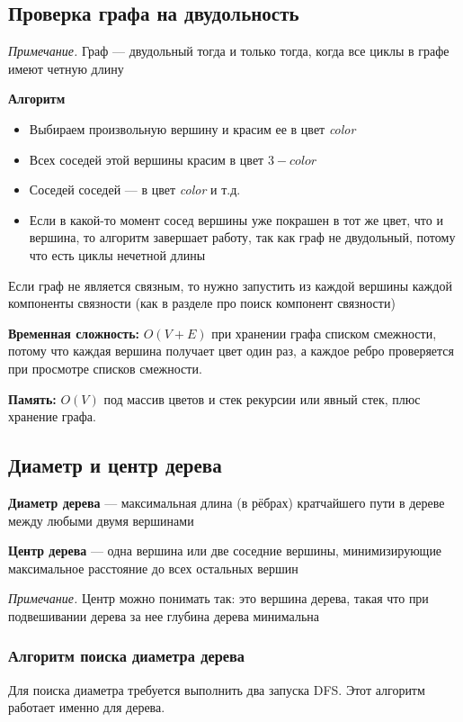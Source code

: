 \documentclass[a4paper]{article}
\begin{document}
\subsection{Проверка графа на двудольность}
\textit{Примечание.} Граф — двудольный тогда и только тогда, когда все циклы в графе имеют четную длину

\textbf{Алгоритм}

\begin{itemize}
    \item Выбираем произвольную вершину и красим ее в цвет \textit{color}
    \item Всех соседей этой вершины красим в цвет $3-color$
    \item Соседей соседей — в цвет \textit{color} и т.д.
    \item Если в какой-то момент сосед вершины уже покрашен в тот же цвет, что и вершина, то алгоритм завершает работу, так как граф не двудольный, потому что есть циклы нечетной длины
\end{itemize}

Если граф не является связным, то нужно запустить \dfs из каждой вершины каждой компоненты связности (как в разделе про поиск компонент связности)

\textbf{Временная сложность:} $O(V+E)$ при хранении графа списком смежности, потому что каждая вершина получает цвет один раз, а каждое ребро проверяется при просмотре списков смежности.

\textbf{Память:} $O(V)$ под массив цветов и стек рекурсии или явный стек, плюс хранение графа.


\subsection{Диаметр и центр дерева}
\textbf{Диаметр дерева} — максимальная длина (в рёбрах) кратчайшего пути в дереве между любыми двумя вершинами

\textbf{Центр дерева} — одна вершина или две соседние вершины, минимизирующие максимальное расстояние до всех остальных вершин

\textit{Примечание.} Центр можно понимать так: это вершина дерева, такая что при подвешивании дерева за нее глубина дерева минимальна

\subsubsection*{Алгоритм поиска диаметра дерева}
Для поиска диаметра требуется выполнить два запуска DFS. Этот алгоритм работает именно для дерева.
\end{document}
